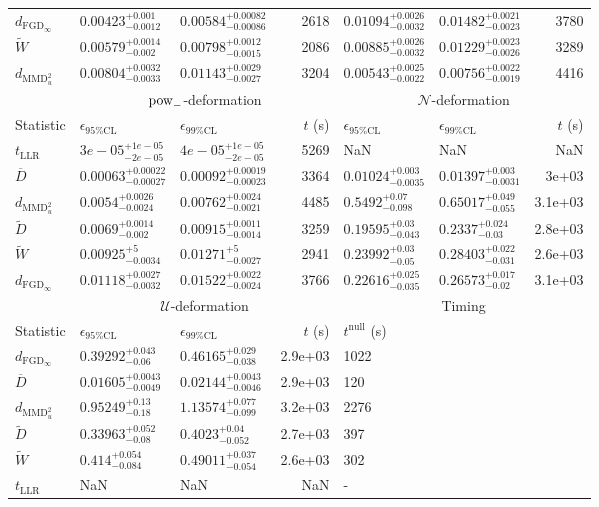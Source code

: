 \begin{tabular}{l|llr|llr}
	$d_{\mathrm{FGD}_{\infty}}$ & $0.00423_{-0.0012}^{+0.001}$ & $0.00584_{-0.00086}^{+0.00082}$ & 2618 & $0.01094_{-0.0032}^{+0.0026}$ & $0.01482_{-0.0023}^{+0.0021}$ & 3780 \\
	$\widetilde{W}$ & $0.00579_{-0.002}^{+0.0014}$ & $0.00798_{-0.0015}^{+0.0012}$ & 2086 & $0.00885_{-0.0032}^{+0.0026}$ & $0.01229_{-0.0026}^{+0.0023}$ & 3289 \\
	$d_{\mathrm{MMD}^{2}_{u}}$ & $0.00804_{-0.0033}^{+0.0032}$ & $0.01143_{-0.0027}^{+0.0029}$ & 3204 & $0.00543_{-0.0022}^{+0.0025}$ & $0.00756_{-0.0019}^{+0.0022}$ & 4416 \\
	\toprule
	\multicolumn{1}{c}{} & \multicolumn{3}{c}{$\rm{pow}_{-}$-deformation} & \multicolumn{3}{c}{$\mathcal{N}$-deformation} \\
	Statistic & $\epsilon_{95\%\mathrm{CL}}$ & $\epsilon_{99\%\mathrm{CL}}$ & $t$ (s) & $\epsilon_{95\%\mathrm{CL}}$ & $\epsilon_{99\%\mathrm{CL}}$ & $t$ (s) \\
	\midrule
	$t_{\mathrm{LLR}}$ & $3e-05_{-2e-05}^{+1e-05}$ & $4e-05_{-2e-05}^{+1e-05}$ & 5269 & NaN & NaN & NaN \\
	$\overline{D}$ & $0.00063_{-0.00027}^{+0.00022}$ & $0.00092_{-0.00023}^{+0.00019}$ & 3364 & $0.01024_{-0.0035}^{+0.003}$ & $0.01397_{-0.0031}^{+0.003}$ & 3e+03 \\
	$d_{\mathrm{MMD}^{2}_{u}}$ & $0.0054_{-0.0024}^{+0.0026}$ & $0.00762_{-0.0021}^{+0.0024}$ & 4485 & $0.5492_{-0.098}^{+0.07}$ & $0.65017_{-0.055}^{+0.049}$ & 3.1e+03 \\
	$\widetilde{D}$ & $0.0069_{-0.002}^{+0.0014}$ & $0.00915_{-0.0014}^{+0.0011}$ & 3259 & $0.19595_{-0.043}^{+0.03}$ & $0.2337_{-0.03}^{+0.024}$ & 2.8e+03 \\
	$\widetilde{W}$ & $0.00925_{-0.0034}^{+5}$ & $0.01271_{-0.0027}^{+5}$ & 2941 & $0.23992_{-0.05}^{+0.03}$ & $0.28403_{-0.031}^{+0.022}$ & 2.6e+03 \\
	$d_{\mathrm{FGD}_{\infty}}$ & $0.01118_{-0.0032}^{+0.0027}$ & $0.01522_{-0.0024}^{+0.0022}$ & 3766 & $0.22616_{-0.035}^{+0.025}$ & $0.26573_{-0.02}^{+0.017}$ & 3.1e+03 \\
	\toprule
	\multicolumn{1}{c}{} & \multicolumn{3}{c}{$\mathcal{U}$-deformation} & \multicolumn{3}{c}{Timing} \\
	Statistic & $\epsilon_{95\%\mathrm{CL}}$ & $\epsilon_{99\%\mathrm{CL}}$ & $t$ (s) & $t^{\mathrm{null}}$ (s) \\
	\midrule
	$d_{\mathrm{FGD}_{\infty}}$ & $0.39292_{-0.06}^{+0.043}$ & $0.46165_{-0.038}^{+0.029}$ & 2.9e+03 & 1022 \\
	$\overline{D}$ & $0.01605_{-0.0049}^{+0.0043}$ & $0.02144_{-0.0046}^{+0.0043}$ & 2.9e+03 & 120 \\
	$d_{\mathrm{MMD}^{2}_{u}}$ & $0.95249_{-0.18}^{+0.13}$ & $1.13574_{-0.099}^{+0.077}$ & 3.2e+03 & 2276 \\
	$\widetilde{D}$ & $0.33963_{-0.08}^{+0.052}$ & $0.4023_{-0.052}^{+0.04}$ & 2.7e+03 & 397 \\
	$\widetilde{W}$ & $0.414_{-0.084}^{+0.054}$ & $0.49011_{-0.054}^{+0.037}$ & 2.6e+03 & 302 \\
	$t_{\mathrm{LLR}}$ & NaN & NaN & NaN & - \\
	\bottomrule
\end{tabular}